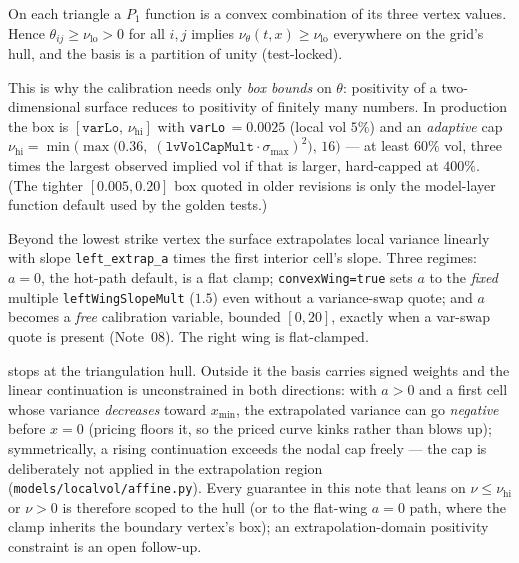 \documentclass[11pt]{article}
\begin{document}
\begin{proposition}
\label{prop:nodal}
On each triangle a $P_1$ function is a convex combination of its three vertex
values. Hence $\theta_{ij}\ge\nu_{\mathrm{lo}}>0$ for all $i,j$ implies
$\nu_\theta(t,x)\ge\nu_{\mathrm{lo}}$ everywhere on the grid's hull, and the
basis is a partition of unity (test-locked).
\end{proposition}

This is why the calibration needs only \emph{box bounds} on $\theta$:
positivity of a two-dimensional surface reduces to positivity of finitely many
numbers. In production the box is $[\texttt{varLo},\,\nu_{\mathrm{hi}}]$ with
\texttt{varLo}$\,=0.0025$ (local vol $5\%$) and an \emph{adaptive} cap
$\nu_{\mathrm{hi}}=\min\big(\max(0.36,\;(\texttt{lvVolCapMult}\cdot
\sigma_{\max})^2\big),\,16\big)$ --- at least $60\%$ vol, three times the
largest observed implied vol if that is larger, hard-capped at $400\%$. (The
tighter $[0.005,0.20]$ box quoted in older revisions is only the model-layer
function default used by the golden tests.)

Beyond the lowest strike vertex the surface extrapolates local variance
linearly with slope \texttt{left\_extrap\_a} times the first interior cell's
slope. Three regimes: $a=0$, the hot-path default, is a flat clamp;
\texttt{convexWing=true} sets $a$ to the \emph{fixed} multiple
\texttt{leftWingSlopeMult} ($1.5$) even without a variance-swap quote; and $a$
becomes a \emph{free} calibration variable, bounded $[0,20]$, exactly when a
var-swap quote is present (Note~08). The right wing is flat-clamped.

\begin{caution}[title={Caution: the extrapolation is outside the positivity guarantee}]
 stops at the triangulation hull. Outside it the basis
carries signed weights and the linear continuation is unconstrained in both
directions: with $a>0$ and a first cell whose variance \emph{decreases}
toward $x_{\min}$, the extrapolated variance can go \emph{negative} before
$x=0$ (pricing floors it, so the priced curve kinks rather than blows up);
symmetrically, a rising continuation exceeds the nodal cap freely --- the cap
is deliberately not applied in the extrapolation region
(\nolinkurl{models/localvol/affine.py}). Every guarantee in this note that
leans on $\nu\le\nu_{\mathrm{hi}}$ or $\nu>0$ is therefore scoped to the hull
(or to the flat-wing $a=0$ path, where the clamp inherits the boundary
vertex's box); an extrapolation-domain positivity constraint is an open
follow-up.
\end{caution}
\end{document}
